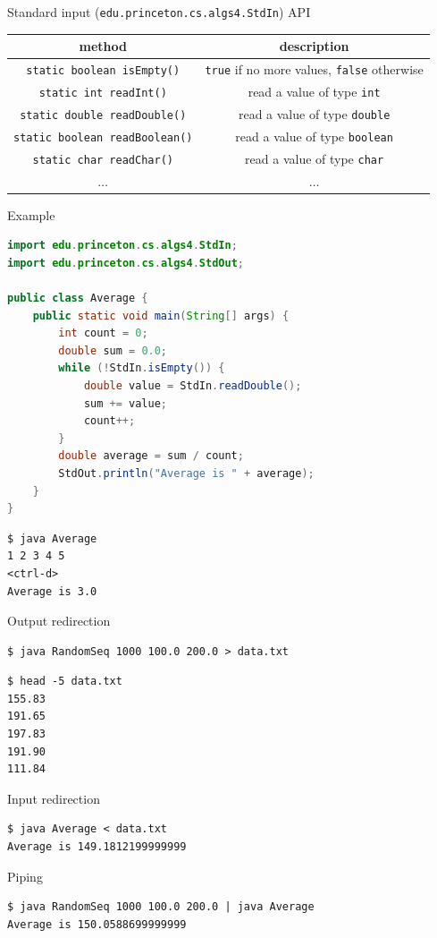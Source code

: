 \documentclass[8pt,a4paper,compress]{beamer}
\begin{document}
\begin{frame}[fragile]
\pause

Standard input (\lstinline{edu.princeton.cs.algs4.StdIn}) API
\begin{center}
\begin{tabular}{cc}
method & description \\ \hline
\lstinline$static boolean isEmpty()$ & \lstinline$true$ if no more values, \lstinline$false$ otherwise \\
\lstinline$static int readInt()$ & read a value of type \lstinline$int$ \\
\lstinline$static double readDouble()$ & read a value of type \lstinline$double$ \\
\lstinline$static boolean readBoolean()$ & read a value of type \lstinline$boolean$ \\
\lstinline$static char readChar()$ & read a value of type \lstinline$char$ \\
$\dots$ & $\dots$ 
\end{tabular} 
\end{center}

\pause
\bigskip

Example
\begin{lstlisting}[language=Java]
import edu.princeton.cs.algs4.StdIn;
import edu.princeton.cs.algs4.StdOut;

public class Average { 
    public static void main(String[] args) { 
        int count = 0; 
        double sum = 0.0;
        while (!StdIn.isEmpty()) {
            double value = StdIn.readDouble();
            sum += value;
            count++;
        }
        double average = sum / count;
        StdOut.println("Average is " + average);
    }
}
\end{lstlisting}

\pause

\begin{lstlisting}[language={}]
$ java Average
1 2 3 4 5
<ctrl-d>
Average is 3.0
\end{lstlisting}
\end{frame}

\begin{frame}[fragile]
\pause

Output redirection
\begin{lstlisting}[language={}]
$ java RandomSeq 1000 100.0 200.0 > data.txt
\end{lstlisting}

\begin{lstlisting}[language={}]
$ head -5 data.txt
155.83
191.65
197.83
191.90
111.84
\end{lstlisting}

\pause
\bigskip

Input redirection
\begin{lstlisting}[language={}]
$ java Average < data.txt
Average is 149.1812199999999
\end{lstlisting}

\pause
\bigskip

Piping
\begin{lstlisting}[language={}]
$ java RandomSeq 1000 100.0 200.0 | java Average
Average is 150.0588699999999
\end{lstlisting}
\end{frame}
\end{document}
